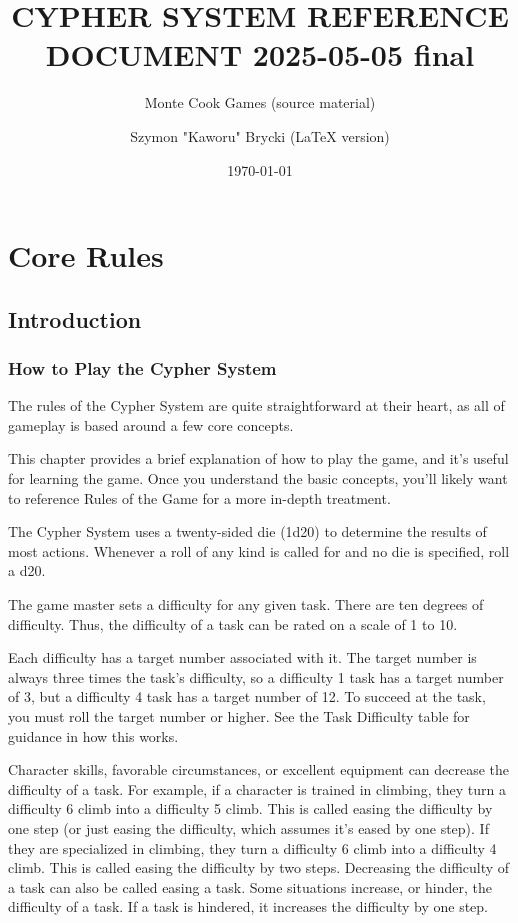 \documentclass[a4paper,10pt]{book}
\title{CYPHER SYSTEM REFERENCE DOCUMENT 2025-05-05 final}
\author{Monte Cook Games (source material) \and Szymon "Kaworu" Brycki (LaTeX version)}
\date{\today}
\begin{document}
\maketitle
\tableofcontents

\part{Core Rules}

\chapter{Introduction}

\begin{multicols}{2}

\section{How to Play the Cypher System}
The rules of the Cypher System are quite straightforward at their heart, as all of gameplay is based around a few core concepts.

This chapter provides a brief explanation of how to play the game, and it’s useful for learning the game. Once you understand the basic concepts, you’ll likely want to reference Rules of the Game for a more in-depth treatment. 

The Cypher System uses a twenty-sided die (1d20) to determine the results of most actions. Whenever a roll of any kind is called for and no die is specified, roll a d20.

The game master sets a difficulty for any given task. There are ten degrees of difficulty. Thus, the difficulty of a task can be rated on a scale of 1 to 10.

Each difficulty has a target number associated with it. The target number is always three times the task’s difficulty, so a difficulty 1 task has a target number of 3, but a difficulty 4 task has a target number of 12. To succeed at the task, you must roll the target number or higher. See the Task Difficulty table for guidance in how this works.

Character skills, favorable circumstances, or excellent equipment can decrease the difficulty of a task. For example, if a character is trained in climbing, they turn a difficulty 6 climb into a difficulty 5 climb. This is called easing the difficulty by one step (or just easing the difficulty, which assumes it’s eased by one step). If they are specialized in climbing, they turn a difficulty 6 climb into a difficulty 4 climb. This is called easing the difficulty by two steps. Decreasing the difficulty of a task can also be called easing a task. Some situations increase, or hinder, the difficulty of a task. If a task is hindered, it increases the difficulty by one step.


\end{multicols}
\end{document}
